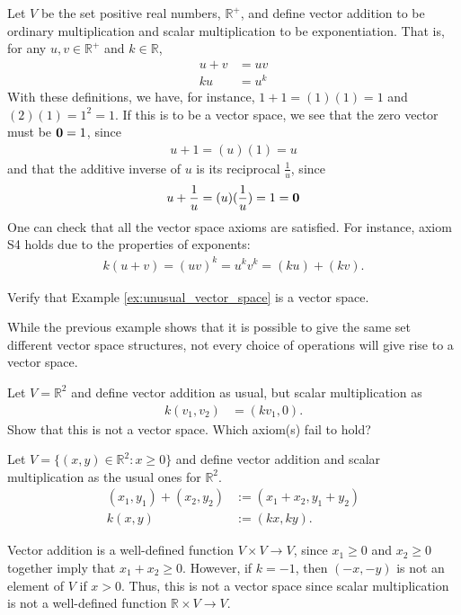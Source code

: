 \documentclass[12pt,letterpaper,reqno]{article}
\numberwithin{equation}{section}
\begin{document}
\begin{example}\label{ex:unusual_vector_space}
	Let $V$ be the set positive real numbers, $\mathbb{R}^+$, and define vector addition to be ordinary multiplication and scalar multiplication to be exponentiation. That is, for any $u,v \in \mathbb{R}^+$ and $k \in \mathbb{R}$,
	\begin{align*}
		u+v&=uv \\
		ku&=u^k 
	\end{align*}
	With these definitions, we have, for instance, $1+1=(1)(1)=1$ and $(2)(1)=1^2=1$. If this is to be a vector space, we see that the zero vector must be ${\bf 0}=1$, since 
	\begin{align*}
		u+1=(u)(1)=u
	\end{align*}
	and that the additive inverse of $u$ is its reciprocal $\frac{1}{u}$, since
	\begin{align*}
		u+\frac{1}{u}=(u)(\frac{1}{u})=1={\bf 0}
	\end{align*}
One can check that all the vector space axioms are satisfied. For instance, axiom S4 holds due to the properties of exponents:
\begin{align*}
	k(u+v)=(uv)^k=u^kv^k=(ku)+(kv).
\end{align*}
\end{example}

\begin{exercise}
	Verify that Example \ref{ex:unusual_vector_space} is a vector space.
\end{exercise}

While the previous example shows that it is possible to give the same set different vector space structures, not every choice of operations will give rise to a vector space.

\begin{exercise}
Let $V=\mathbb{R}^2$ and define vector addition as usual, but scalar multiplication as 
\begin{align*}
	k(v_1,v_2)&=(kv_1,0).
\end{align*}	
Show that this is not a vector space. Which axiom(s) fail to hold?
\end{exercise}

\begin{example}
Let $V=\{(x,y) \in \mathbb{R}^2:x \geq 0\}$ and define vector addition and scalar multiplication as the usual ones for $\mathbb{R}^2$. 
\begin{align*}
	(x_1,y_1)+(x_2,y_2)&:=(x_1+x_2,y_1+y_2) \\
	k(x,y)&:=(kx,ky).
\end{align*}

Vector addition is a well-defined function $V \times V \to V$, since $x_1 \geq 0$ and $x_2 \geq 0$ together imply that $x_1+x_2 \geq 0$. However, if $k=-1$, then $(-x,-y)$ is not an element of $V$ if $x>0$. Thus, this is not a vector space since scalar multiplication is not a well-defined function $\mathbb{R} \times V \to V$.
\end{example}
\end{document}
